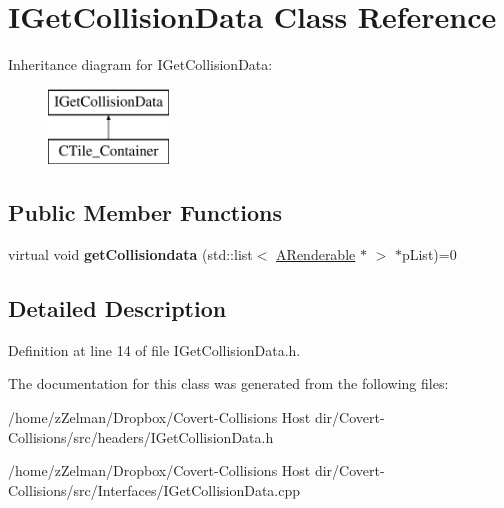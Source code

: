 \hypertarget{classIGetCollisionData}{\section{I\-Get\-Collision\-Data Class Reference}
\label{classIGetCollisionData}
}
Inheritance diagram for I\-Get\-Collision\-Data\-:\begin{figure}[H]
\begin{center}
\leavevmode
\includegraphics[height=2.000000cm]{classIGetCollisionData}
\end{center}
\end{figure}
\subsection*{Public Member Functions}
\begin{DoxyCompactItemize}
\item 
\hypertarget{classIGetCollisionData_ad31b95dda265659e5090fc2c188b30b9}{virtual void {\bfseries get\-Collisiondata} (std\-::list$<$ \hyperlink{classARenderable}{A\-Renderable} $\ast$ $>$ $\ast$p\-List)=0}\label{classIGetCollisionData_ad31b95dda265659e5090fc2c188b30b9}

\end{DoxyCompactItemize}


\subsection{Detailed Description}


Definition at line 14 of file I\-Get\-Collision\-Data.\-h.



The documentation for this class was generated from the following files\-:\begin{DoxyCompactItemize}
\item 
/home/z\-Zelman/\-Dropbox/\-Covert-\/\-Collisions Host dir/\-Covert-\/\-Collisions/src/headers/I\-Get\-Collision\-Data.\-h\item 
/home/z\-Zelman/\-Dropbox/\-Covert-\/\-Collisions Host dir/\-Covert-\/\-Collisions/src/\-Interfaces/I\-Get\-Collision\-Data.\-cpp\end{DoxyCompactItemize}
